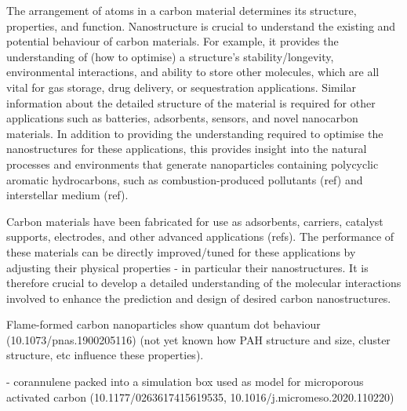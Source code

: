The arrangement of atoms in a carbon material determines its structure, properties, and function. Nanostructure is crucial to understand the existing and potential behaviour of carbon materials. For example, it provides the understanding of (how to optimise) a structure's stability/longevity, environmental interactions, and ability to store other molecules, which are all vital for gas storage, drug delivery, or sequestration applications.  Similar information about the detailed structure of the material is required for other applications such as batteries, adsorbents, %
sensors, and novel nanocarbon materials.
In addition to providing the understanding required to optimise the nanostructures for these applications, this provides insight into the natural processes and environments that generate nanoparticles containing polycyclic aromatic hydrocarbons, such as combustion-produced pollutants (ref) and interstellar medium (ref).

Carbon materials have been fabricated for use as adsorbents, carriers, catalyst supports, electrodes, and other advanced applications (refs).  The performance of these materials can be directly improved/tuned for these applications by adjusting their physical properties - in particular their nanostructures.  It is therefore crucial to develop a detailed understanding of the molecular interactions involved to enhance the prediction and design of desired carbon nanostructures.

Flame-formed carbon nanoparticles show quantum dot behaviour (10.1073/pnas.1900205116) (not yet known how PAH structure and size, cluster structure, etc influence these properties).

- corannulene packed into a simulation box used as model for microporous activated carbon (10.1177/0263617415619535, 10.1016/j.micromeso.2020.110220) 




